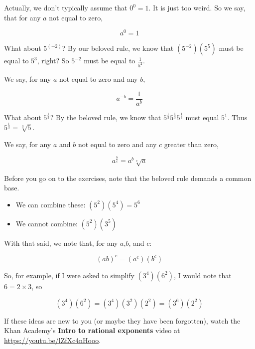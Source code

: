 Actually, we don't typically assume that $0^0 = 1$. It is just too
weird. So we say, that for any $a$ not equal to zero,

$$a^0 = 1$$

What about $5^{(-2)}$?  By our beloved rule, we know that
$\left(5^{-2}\right)\left(5^5\right)$ must be equal to $5^3$, right?
So $5^{-2}$ must be equal to $\frac{1}{5^2}$.

We say, for any $a$ not equal to zero and any $b$,

$$a^{-b} = \frac{1}{a^{b}}$$

What about $5^{\frac{1}{3}}$? By the beloved rule, we know that $5^{\frac{1}{3}}5^{\frac{1}{3}}5^{\frac{1}{3}}$ must equal $5^1$. Thus $5^{\frac{1}{3}} = \sqrt[3]{5}$.

We say, for any $a$ and $b$ not equal to zero and any $c$ greater than zero,

$$a^{\frac{b}{c}} = a^b \sqrt[c]{a}$$

Before you go on to the exercises, note that the beloved rule demands a common base.
\begin{itemize}
\item We can combine these: $\left(5^2\right)\left(5^4\right) = 5^6$
\item We cannot combine: $\left(5^2\right)\left(3^5\right)$
\end{itemize}

With that said, we note that, for any $a$,$b$, and $c$:

$$\left(ab\right)^c = \left(a^c\right) \left(b^c\right)$$

So, for example, if I were asked to simplify
$\left(3^4\right)\left(6^2\right)$, I would note that $6 = 2 \times
3$, so

$$\left(3^4\right)\left(6^2\right) = \left(3^4\right)\left(3^2\right)\left(2^2\right)  = \left(3^6\right)\left(2^2\right)$$

If these ideas are new to you (or maybe they have been forgotten),
watch the Khan Academy's \textbf{Intro to rational exponents} video at
\url{https://youtu.be/lZfXc4nHooo}.


